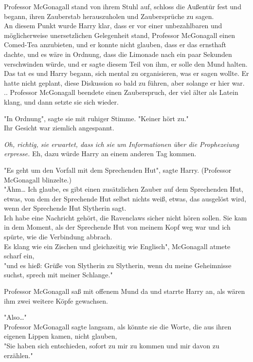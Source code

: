 {Professor McGonagall stand von ihrem Stuhl auf, schloss die Außentür fest und begann, ihren Zauberstab herauszuholen und Zaubersprüche zu sagen.\\ An diesem Punkt wurde Harry klar, dass er vor einer unbezahlbaren und möglicherweise unersetzlichen Gelegenheit stand, Professor McGonagall einen Comed-Tea anzubieten, und er konnte nicht glauben, dass er das ernsthaft dachte, und es wäre in Ordnung, dass die Limonade nach ein paar Sekunden verschwinden würde, und er sagte diesem Teil von ihm, er solle den Mund halten.\\ Das tat es und Harry begann, sich mental zu organisieren, was er sagen wollte. Er hatte nicht geplant, diese Diskussion so bald zu führen, aber solange er hier war.\\ .. Professor McGonagall beendete einen Zauberspruch, der viel älter als Latein klang, und dann setzte sie sich wieder.

"In Ordnung", sagte sie mit ruhiger Stimme. "Keiner hört zu."\\ Ihr Gesicht war ziemlich angespannt.

\emph{Oh, richtig, sie erwartet, dass ich sie um Informationen über die Prophezeiung erpresse.} Eh, dazu würde Harry an einem anderen Tag kommen.

"Es geht um den Vorfall mit dem Sprechenden Hut", sagte Harry. (Professor McGonagall blinzelte.)\\ "Ähm… Ich glaube, es gibt einen zusätzlichen Zauber auf dem Sprechenden Hut, etwas, von dem der Sprechende Hut selbst nichts weiß, etwas, das ausgelöst wird, wenn der Sprechende Hut Slytherin sagt.\\ Ich habe eine Nachricht gehört, die Ravenclaws sicher nicht hören sollen. Sie kam in dem Moment, als der Sprechende Hut von meinem Kopf weg war und ich spürte, wie die Verbindung abbrach.\\ Es klang wie ein Zischen und gleichzeitig wie Englisch", McGonagall atmete scharf ein,\\ "und es hieß: Grüße von Slytherin zu Slytherin, wenn du meine Geheimnisse suchst, sprech mit meiner Schlange."

Professor McGonagall saß mit offenem Mund da und starrte Harry an, als wären ihm zwei weitere Köpfe gewachsen.

"Also…"\\ Professor McGonagall sagte langsam, als könnte sie die Worte, die aus ihren eigenen Lippen kamen, nicht glauben,\\ "Sie haben sich entschieden, sofort zu mir zu kommen und mir davon zu erzählen."

}
